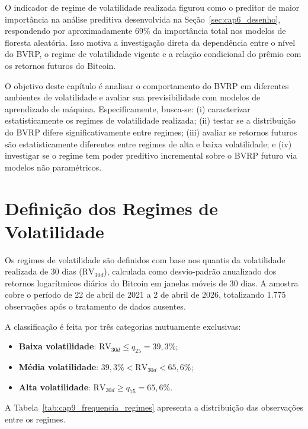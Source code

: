 O indicador de regime de volatilidade realizada figurou como o preditor
de maior importância na análise preditiva desenvolvida na
Seção~\ref{sec:cap6_desenho}, respondendo por aproximadamente 69\% da
importância total nos modelos de floresta aleatória. Isso motiva a
investigação direta da dependência entre o nível do BVRP, o regime de
volatilidade vigente e a relação condicional do prêmio com os retornos
futuros do Bitcoin.

O objetivo deste capítulo é analisar o comportamento do BVRP em
diferentes ambientes de volatilidade e avaliar sua previsibilidade com
modelos de aprendizado de máquina. Especificamente, busca-se:
(i) caracterizar estatisticamente os regimes de volatilidade realizada;
(ii) testar se a distribuição do BVRP difere significativamente entre
regimes; (iii) avaliar se retornos futuros são estatisticamente
diferentes entre regimes de alta e baixa volatilidade; e (iv) investigar
se o regime tem poder preditivo incremental sobre o BVRP futuro via
modelos não paramétricos.

\section{Definição dos Regimes de Volatilidade}
\label{sec:cap6_regimes}
\label{sec:cap9_regimes}

Os regimes de volatilidade são definidos com base nos quantis da volatilidade realizada
de 30 dias ($\text{RV}_{30d}$), calculada como desvio-padrão anualizado dos retornos
logarítmicos diários do Bitcoin em janelas móveis de 30 dias. A amostra cobre o período
de 22 de abril de 2021 a 2 de abril de 2026, totalizando 1.775 observações após
o tratamento de dados ausentes.

A classificação é feita por três categorias mutuamente exclusivas:

\begin{itemize}
    \item \textbf{Baixa volatilidade}: $\text{RV}_{30d} \leq q_{25} = 39{,}3\%$;
    \item \textbf{Média volatilidade}: $39{,}3\% < \text{RV}_{30d} < 65{,}6\%$;
    \item \textbf{Alta volatilidade}: $\text{RV}_{30d} \geq q_{75} = 65{,}6\%$.
\end{itemize}

A Tabela~\ref{tab:cap9_frequencia_regimes} apresenta a distribuição das observações
entre os regimes.

